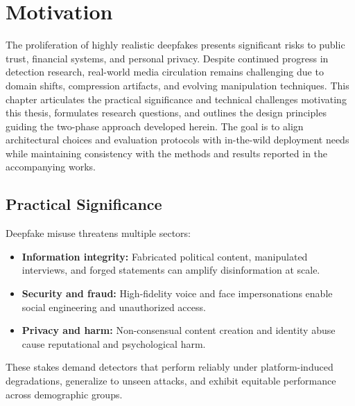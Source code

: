 \chapter{Motivation}
The proliferation of highly realistic deepfakes presents significant risks to public trust, financial systems, and personal privacy. Despite continued progress in detection research, real-world media circulation remains challenging due to domain shifts, compression artifacts, and evolving manipulation techniques. This chapter articulates the practical significance and technical challenges motivating this thesis, formulates research questions, and outlines the design principles guiding the two-phase approach developed herein. The goal is to align architectural choices and evaluation protocols with in-the-wild deployment needs while maintaining consistency with the methods and results reported in the accompanying works.

\section{Practical Significance}
Deepfake misuse threatens multiple sectors:
\begin{itemize}
    \item \textbf{Information integrity:} Fabricated political content, manipulated interviews, and forged statements can amplify disinformation at scale.
    \item \textbf{Security and fraud:} High-fidelity voice and face impersonations enable social engineering and unauthorized access.
    \item \textbf{Privacy and harm:} Non-consensual content creation and identity abuse cause reputational and psychological harm.
\end{itemize}
These stakes demand detectors that perform reliably under platform-induced degradations, generalize to unseen attacks, and exhibit equitable performance across demographic groups.

